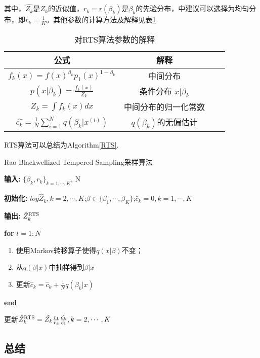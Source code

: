 \documentclass[11pt]{article}
\begin{document}
其中，$\hat{Z_{k}}$是$Z_{k}$的近似值，$r_{k}=r(\beta_{k})$是$\beta_{k}$的先验分布，\cite{RTS}中建议可以选择为均匀分布，即$r_{k} = \frac{1}{K}$。其他参数的计算方法及解释见表\ref{RTS_Formu}

\begin{table}[!htbp]
  \centering  
  \begin{tabular}{cccc} 
  \hline
  公式 & 解释 \\ \hline
  $f_{k}(x) = f(x)^{\beta_{k}}p_{1}(x)^{1-\beta_{k}}$ & 中间分布 \\
  $p(x\vert\beta_{k}) = \frac{f_{k}(x)}{Z_{k}}$ & 条件分布 $x\vert\beta_{k}$ \\ 
  $Z_{k} = \int f_{k}(x)dx$ & 中间分布的归一化常数 \\
  $\hat{c_{k}}=\frac{1}{N}\sum_{i = 1}^{N}q(\beta_{k}\vert x^{(i)})$ & $q(\beta_{k})$的无偏估计\\\hline
\end{tabular}
\caption{对RTS算法参数的解释}
\label{RTS_Formu}
\end{table}

RTS算法可以总结为Algorithm\ref{RTS}.
\begin{algorithm}[t] 
\caption{Rao-Blackwellized Tempered Sampling采样算法} 

\textbf{输入:} $\{\beta_{k},r_{k}\}_{k = 1,\cdots,K}$, N

\textbf{初始化:} $log\hat{Z}_{k},k = 2,\cdots,K$;$\beta\in\{\beta_{1},\cdots,\beta_{K}\}$;$\hat{c}_{k} = 0,k = 1,\cdots,K$

\textbf{输出:} $\hat{Z}_{k}^{\rm RTS}$

\textbf{for} $t=1:N$ 
\begin{enumerate} 
  \item 使用Markov转移算子使得$q(x\vert\beta)$不变；

  \item 从$q(\beta\vert x)$中抽样得到$\beta\vert x$

  \item 更新$\hat{c}_{k} = \hat{c}_{k} + \frac{1}{N}q(\beta_{k}\vert x)$

\end{enumerate} 
\textbf{end}

更新$\hat{Z}_{k}^{\rm RTS} = \hat{Z_{k}}\frac{r_{1}}{r_{k}}\frac{\hat{c_{k}}}{\hat{c_{1}}}, k = 2,\cdots,K$
\label{RTS} 
\end{algorithm}

\subsection{总结}
\end{document}
